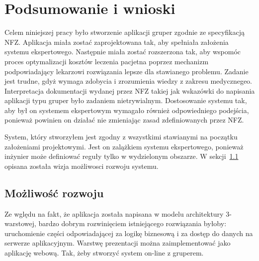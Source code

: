 \chapter{Podsumowanie i wnioski}
\label{cha:podsumowanie}

Celem niniejszej pracy było stworzenie aplikacji gruper zgodnie ze specyfikacją NFZ. Aplikacja miała zostać zaprojektowana tak, aby spełniała założenia systemu ekspertowego. Następnie miała zostać rozszerzona tak, aby wspomóc proces optymalizacji kosztów leczenia pacjetna poprzez mechanizm podpowiadający lekarzowi rozwiązania lepsze dla stawianego problemu. Zadanie jest trudne, gdyż wymaga zdobycia i zrozumienia wiedzy z zakresu medycznegeo. Interpretacja dokumentacji wydanej przez NFZ takiej jak wskazówki do napisania aplikacji typu gruper było zadaniem nietrywialnym. Dostosowanie systemu tak, aby był on systemem ekspertowym wymagało również odpowiedniego podejścia, ponieważ powinien on działać nie zmieniając zasad zdefiniowanych przez NFZ.

System, który stworzyłem jest zgodny z wszystkimi stawianymi na początku założeniami projektowymi. Jest on zalążkiem systemu ekspertowego, ponieważ inżynier może definiować reguły tylko w wydzielonym obszarze. W sekcji~\ref{sec:mozliwoscRozwoju} opisana została wizja możliwosci rozwoju systemu.


\section{Możliwość rozwoju}
\label{sec:mozliwoscRozwoju}

Ze wględu na fakt, że aplikacja została napisana w modelu architektury 3-warstowej, bardzo dobrym rozwinięciem istniejącego rozwiązania byłoby: uruchomienie części odpowiadającej za logikę biznesową i za dostęp do danych na serwerze aplikacyjnym. Warstwę prezentacji można zaimplementować jako aplikację webową. Tak, żeby stworzyć system on-line z gruperem.

